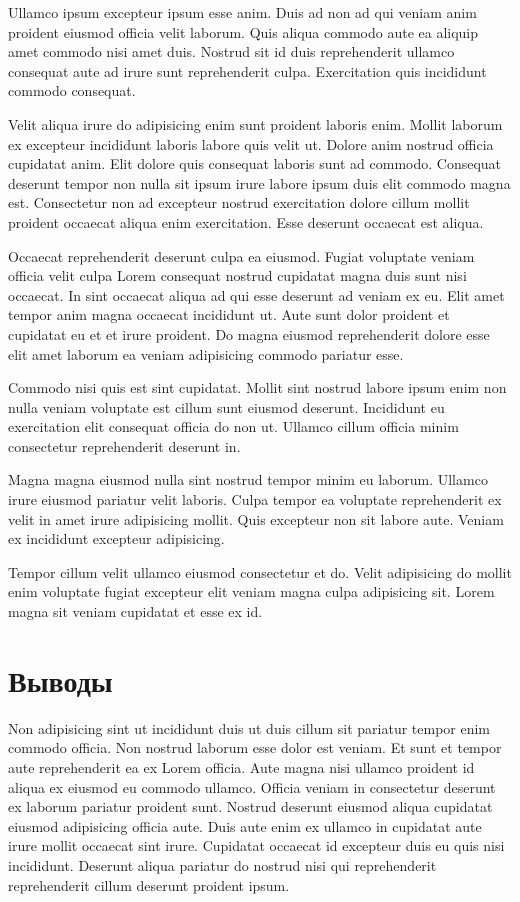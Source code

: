 \documentclass[12pt,a4paper]{report}
\begin{document}
Ullamco ipsum excepteur ipsum esse anim. Duis ad non ad qui veniam anim proident eiusmod officia velit laborum. Quis aliqua commodo aute ea aliquip amet commodo nisi amet duis. Nostrud sit id duis reprehenderit ullamco consequat aute ad irure sunt reprehenderit culpa. Exercitation quis incididunt commodo consequat.

Velit aliqua irure do adipisicing enim sunt proident laboris enim. Mollit laborum ex excepteur incididunt laboris labore quis velit ut. Dolore anim nostrud officia cupidatat anim. Elit dolore quis consequat laboris sunt ad commodo. Consequat deserunt tempor non nulla sit ipsum irure labore ipsum duis elit commodo magna est. Consectetur non ad excepteur nostrud exercitation dolore cillum mollit proident occaecat aliqua enim exercitation. Esse deserunt occaecat est aliqua.

Occaecat reprehenderit deserunt culpa ea eiusmod. Fugiat voluptate veniam officia velit culpa Lorem consequat nostrud cupidatat magna duis sunt nisi occaecat. In sint occaecat aliqua ad qui esse deserunt ad veniam ex eu. Elit amet tempor anim magna occaecat incididunt ut. Aute sunt dolor proident et cupidatat eu et et irure proident. Do magna eiusmod reprehenderit dolore esse elit amet laborum ea veniam adipisicing commodo pariatur esse.

Commodo nisi quis est sint cupidatat. Mollit sint nostrud labore ipsum enim non nulla veniam voluptate est cillum sunt eiusmod deserunt. Incididunt eu exercitation elit consequat officia do non ut. Ullamco cillum officia minim consectetur reprehenderit deserunt in.

Magna magna eiusmod nulla sint nostrud tempor minim eu laborum. Ullamco irure eiusmod pariatur velit laboris. Culpa tempor ea voluptate reprehenderit ex velit in amet irure adipisicing mollit. Quis excepteur non sit labore aute. Veniam ex incididunt excepteur adipisicing.

Tempor cillum velit ullamco eiusmod consectetur et do. Velit adipisicing do mollit enim voluptate fugiat excepteur elit veniam magna culpa adipisicing sit. Lorem magna sit veniam cupidatat et esse ex id.



\chapter*{Выводы}

Non adipisicing sint ut incididunt duis ut duis cillum sit pariatur tempor enim commodo officia. Non nostrud laborum esse dolor est veniam. Et sunt et tempor aute reprehenderit ea ex Lorem officia. Aute magna nisi ullamco proident id aliqua ex eiusmod eu commodo ullamco. Officia veniam in consectetur deserunt ex laborum pariatur proident sunt. Nostrud deserunt eiusmod aliqua cupidatat eiusmod adipisicing officia aute. Duis aute enim ex ullamco in cupidatat aute irure mollit occaecat sint irure. Cupidatat occaecat id excepteur duis eu quis nisi incididunt. Deserunt aliqua pariatur do nostrud nisi qui reprehenderit reprehenderit cillum deserunt proident ipsum.
\end{document}
